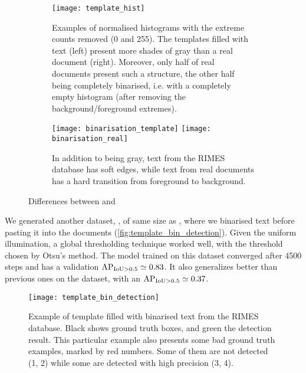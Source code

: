 			\begin{figure}
				\begin{subfigure}{\linewidth}
					\texttt{[image: template\_hist]}
					\caption[Template histograms]{
						Examples of normalised histograms with the extreme counts removed (0 and 255). The templates filled with text (left) present more shades of gray than a real document (right).  Moreover, only half of real documents present such a structure, the other half being completely binarised, i.e. with a completely empty histogram (after removing the background/foreground extremes).
					}
					\label{fig:template_gray_hist}
				\end{subfigure}
				\begin{subfigure}{\linewidth}
					\texttt{[image: binarisation\_template]}
					\texttt{[image: binarisation\_real]}
					\caption{In addition to being gray, text from the RIMES database has soft edges, while text from real documents has a hard transition from foreground to background.}
					\label{fig:template_gray_example}
				\end{subfigure}
				\caption{Differences between  and }
				\label{fig:template_gray}
			\end{figure}

			We generated another dataset, , of same size as , where we binarised text before pasting it into the documents (\autoref{fig:template_bin_detection}). Given the uniform illumination, a global thresholding technique worked well, with the threshold chosen by Otsu's method. The model trained on this dataset converged after 4500 steps and has a validation \(\operatorname{\operatorname{AP}_{\operatorname{IoU} > 0.5}} \simeq 0.83 \). It also generalizes better than previous ones on the  dataset, with an \(\operatorname{\operatorname{AP}_{\operatorname{IoU} > 0.5}} \simeq 0.37\).

			\begin{figure}
				\texttt{[image: template\_bin\_detection]}
				\caption[ example]{Example of template filled with binarised text from the RIMES database. Black shows ground truth boxes, and green the detection result. This particular example also presents some bad ground truth examples, marked by red numbers. Some of them are not detected (1, 2) while some are detected with high precision (3, 4). }
				\label{fig:template_bin_detection}
			\end{figure}

